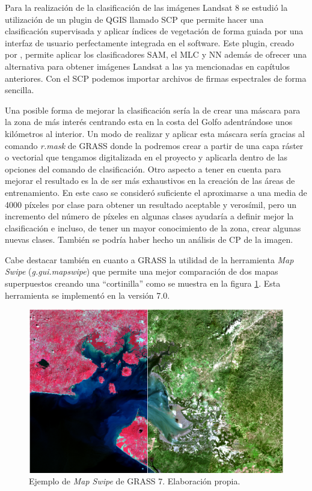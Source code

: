 Para la realización de la clasificación de las imágenes Landsat 8 se estudió la utilización de un plugin de QGIS llamado \ac{SCP} que permite hacer una clasificación supervisada y aplicar índices de vegetación de forma guiada por una interfaz de usuario perfectamente integrada en el software. Este plugin, creado por \cite{Congedo2015}, permite aplicar los clasificadores \ac{SAM}, el \ac{MLC} y \ac{NN} además de ofrecer una alternativa para obtener imágenes Landsat a las ya mencionadas en capítulos anteriores. Con el \ac{SCP} podemos importar archivos de firmas espectrales de forma sencilla.\Sep

Una posible forma de mejorar la clasificación sería la de crear una máscara para la zona de más interés centrando esta en la costa del Golfo adentrándose unos kilómetros al interior. Un modo de realizar y aplicar esta máscara sería gracias al comando \textit{r.mask} de GRASS donde la podremos crear a partir de una capa ráster o vectorial que tengamos digitalizada en el proyecto y aplicarla dentro de las opciones del comando de clasificación. Otro aspecto a tener en cuenta para mejorar el resultado es la de ser más exhaustivos en la creación de las áreas de entrenamiento. En este caso se consideró suficiente el aproximarse a una media de 4000 píxeles por clase para obtener un resultado aceptable y verosímil, pero un incremento del número de píxeles en algunas clases ayudaría a definir mejor la clasificación e incluso, de tener un mayor conocimiento de la zona, crear algunas nuevas clases. También se podría haber hecho un análisis de \ac{CP} de la imagen.\Sep

Cabe destacar también en cuanto a GRASS la utilidad de la herramienta \textit{Map Swipe} (\textit{g.gui.mapswipe}) que permite una mejor comparación de dos mapas superpuestos creando una ``cortinilla'' como se muestra en la figura \ref{fig:map_swipe}. Esta herramienta se implementó en la versión 7.0.

\begin{figure}
	\centering
	\includegraphics[width=0.9\linewidth]{./Imagenes/Map_swipe.eps}
	\caption[\textit{Map Swipe} de GRASS 7]{Ejemplo de \textit{Map Swipe} de GRASS 7. Elaboración propia.}
	\label{fig:map_swipe}
\end{figure}